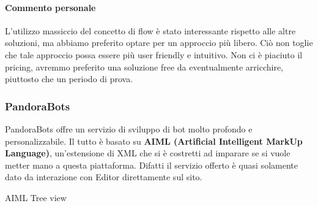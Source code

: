 \documentclass[]{article}
\begin{document}
\paragraph{Commento personale}
L’utilizzo massiccio del concetto di flow è stato interessante rispetto alle altre soluzioni, ma abbiamo preferito optare per un approccio più libero. Ciò non toglie che tale approccio possa essere più user friendly e intuitivo. Non ci è piaciuto il pricing, avremmo preferito una soluzione free da eventualmente arricchire, piuttosto che un periodo di prova.


\subsubsection{PandoraBots}
PandoraBots offre un servizio di sviluppo di bot molto profondo e personalizzabile. Il tutto è basato su \textbf{AIML (Artificial Intelligent MarkUp Language)}, un’estensione di XML che si è costretti ad imparare se si vuole metter mano a questa piattaforma. Difatti il servizio offerto è quasi solamente dato da interazione con Editor direttamente sul sito. 
\begin{center}
\footnotesize{AIML Tree view }
\end{center}
\end{document}
